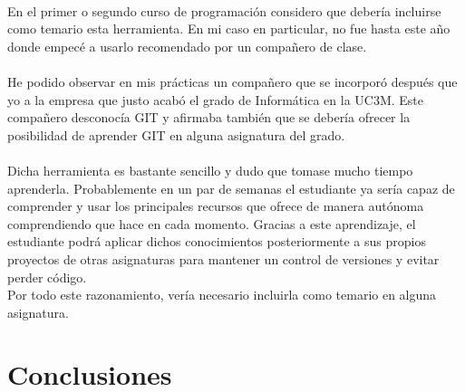 \documentclass[a4paper,12pt]{article}
\begin{document}
\begin{itemize}
\\
En el primer o segundo curso de programación considero que debería incluirse como temario esta herramienta. En mi caso en particular, no fue hasta este año donde empecé a usarlo recomendado por un compañero de clase. \\
\\
He podido observar en mis prácticas un compañero que se incorporó después que yo a la empresa que justo acabó el grado de Informática en la UC3M. Este compañero desconocía GIT y afirmaba también que se debería ofrecer la posibilidad de aprender GIT en alguna asignatura del grado.\\
\\Dicha herramienta es bastante sencillo y dudo que tomase mucho tiempo aprenderla. Probablemente en un par de semanas el estudiante ya sería capaz de comprender y usar los principales recursos que ofrece de manera autónoma comprendiendo que hace en cada momento. Gracias a este aprendizaje, el estudiante podrá aplicar dichos conocimientos posteriormente a sus propios proyectos de otras asignaturas para mantener un control de versiones y evitar perder código. \\
Por todo este razonamiento, vería necesario incluirla como temario en alguna asignatura.
\end{itemize}


\section{Conclusiones}
\end{document}
